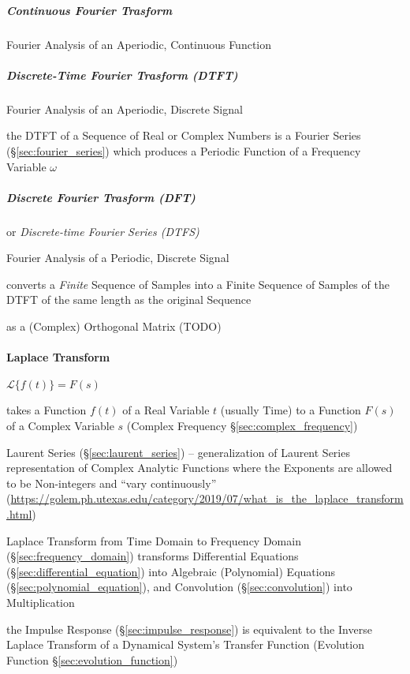 \subparagraph{Continuous Fourier Trasform}
\label{sec:continuous_fourier_transform}\hfill

Fourier Analysis of an Aperiodic, Continuous Function



\subparagraph{Discrete-Time Fourier Trasform (DTFT)}\label{sec:dtft}\hfill

Fourier Analysis of an Aperiodic, Discrete Signal

the DTFT of a Sequence of Real or Complex Numbers is a Fourier Series
(\S\ref{sec:fourier_series}) which produces a Periodic Function of a Frequency
Variable $\omega$



\subparagraph{Discrete Fourier Trasform (DFT)}\label{sec:dft}\hfill

or \emph{Discrete-time Fourier Series (DTFS)}

Fourier Analysis of a Periodic, Discrete Signal

converts a \emph{Finite} Sequence of Samples into a Finite Sequence of Samples
of the DTFT of the same length as the original Sequence

as a (Complex) Orthogonal Matrix (TODO)



\paragraph{Laplace Transform}\label{sec:laplace_transform}\hfill

$\mathcal{L}\{f(t)\} = F(s)$

takes a Function $f(t)$ of a Real Variable $t$ (usually Time) to a Function
$F(s)$ of a Complex Variable $s$ (Complex Frequency
\S\ref{sec:complex_frequency})

\fist Laurent Series (\S\ref{sec:laurent_series}) -- generalization of
Laurent Series representation of Complex Analytic Functions where the Exponents
are allowed to be Non-integers and ``vary continuously''
(\url{https://golem.ph.utexas.edu/category/2019/07/what_is_the_laplace_transform.html})

Laplace Transform from Time Domain to Frequency Domain
(\S\ref{sec:frequency_domain}) transforms Differential Equations
(\S\ref{sec:differential_equation}) into Algebraic (Polynomial) Equations
(\S\ref{sec:polynomial_equation}), and Convolution (\S\ref{sec:convolution})
into Multiplication

the Impulse Response (\S\ref{sec:impulse_response}) is equivalent to the Inverse
Laplace Transform of a Dynamical System's Transfer Function (Evolution Function
\S\ref{sec:evolution_function})

